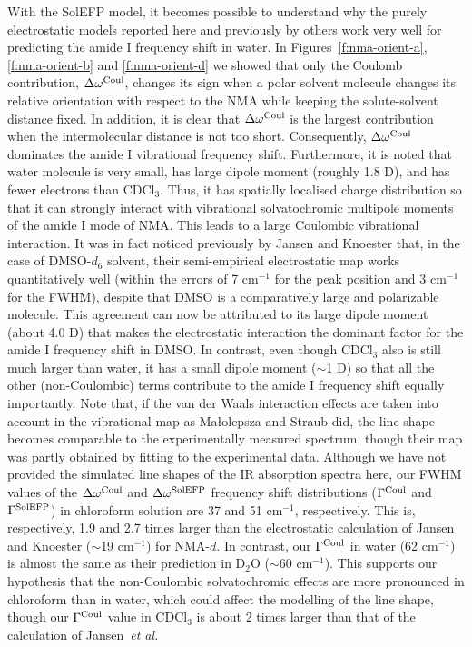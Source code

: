 \documentclass[a4paper,titlepage,twoside,fleqn,12pt]{book}
\begin{document}
\begin{refsection}
With the SolEFP model, it becomes possible to understand
why the purely electrostatic models reported here and
previously by others work very well for predicting the amide
I frequency shift in water. In Figures~\ref{f:nma-orient-a}, 
\ref{f:nma-orient-b} and \ref{f:nma-orient-d} we showed that only the Coulomb
contribution, $\Delta\omega^{\rm Coul}$, changes its sign when a polar solvent
molecule changes its relative orientation with respect to the
NMA while keeping the solute\hyp{}solvent distance fixed. In
addition, it is clear
that $\Delta\omega^{\rm Coul}$ is the largest contribution when the intermolecular
distance is not too short. Consequently, $\Delta\omega^{\rm Coul}$ dominates the
amide I vibrational frequency shift. Furthermore, it is noted
that water molecule is very small, has large dipole moment
(roughly 1.8 D), and has fewer electrons than CDCl$_3$. Thus,
it has spatially localised charge distribution so that it can
strongly interact with vibrational solvatochromic multipole
moments of the amide I mode of NMA. This leads to
a large Coulombic vibrational interaction. It was in fact
noticed previously by Jansen and Knoester \citep{Jansen.Knoester.JCP.2006} 
that, in the case
of DMSO-$d_6$ solvent, their semi\hyp{}empirical electrostatic map
works quantitatively well (within the errors of 7 cm$^{-1}$ for
the peak position and 3 cm$^{-1}$ for the FWHM), despite that
DMSO is a comparatively large and polarizable molecule.
This agreement can now be attributed to its large dipole
moment (about 4.0 D) that makes the electrostatic interaction
the dominant factor for the amide I frequency shift in DMSO.
In contrast, even though CDCl$_3$ also is still much larger
than water, it has a small dipole moment ($\sim$1 D) so that
all the other (non\hyp{}Coulombic) terms contribute to the amide
I frequency shift equally importantly. Note that, if the van
der Waals interaction effects are taken into account in the
vibrational map as Ma{\l}olepsza and Straub \citep{Malolepsza.Straub.JPCB.2014} did, the line
shape becomes comparable to the experimentally measured
spectrum, though their map was partly obtained by fitting to
the experimental data. Although we have not provided the
simulated line shapes of the IR absorption spectra here, our
FWHM values of the $\Delta\omega^{\rm Coul}$ and $\Delta\omega^{\rm SolEFP}$ frequency shift
distributions ($\Gamma^{\rm Coul}$ and $\Gamma^{\rm SolEFP}$) in chloroform solution are 37
and 51 cm$^{-1}$, respectively. This is, respectively, 1.9 and 2.7
times larger than the electrostatic calculation of Jansen and
Knoester ($\sim$19 cm$^{-1}$) for NMA-$d$. \citep{Jansen.Knoester.JCP.2006,Jansen.JPCB.2014} 
In contrast, our $\Gamma^{\rm Coul}$
in water (62 cm$^{-1}$) is almost the same as their prediction
in D$_2$O ($\sim$60 cm$^{-1}$). \citep{Jansen.Knoester.JCP.2006} 
This supports our hypothesis that the
non\hyp{}Coulombic solvatochromic effects are more pronounced
in chloroform than in water, which could affect the modelling
of the line shape, though our $\Gamma^{\rm Coul}$ value in CDCl$_3$ is about 2
times larger than that of the calculation of Jansen~\emph{et al.}


\end{refsection}
\end{document}
